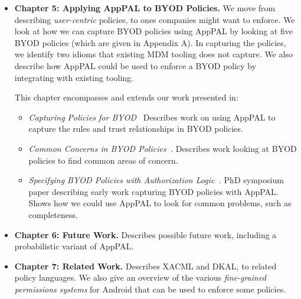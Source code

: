 \documentclass[thesis.tex]{subfiles}
\begin{document}
\begin{itemize}
\item \textbf{Chapter 5: Applying AppPAL to BYOD Policies.}
  We move from describing \emph{user-centric} policies, to ones companies might
  want to enforce. We look at how we can capture BYOD policies using AppPAL by
  looking at five BYOD policies (which are given in Appendix A). In capturing the
  policies, we identify two idioms that existing MDM tooling does not capture. We
  also describe how AppPAL could be used to enforce a BYOD policy by integrating
  with existing tooling.
  
  This chapter encompasses and extends our work presented in:
  \begin{itemize}
  \item\emph{Capturing Policies for BYOD~\cite{hallett_capturing_2017}} Describes work on using AppPAL to capture the rules and trust relationships in BYOD policies.
  \item\emph{Common Concerns in BYOD Policies~\cite{hallett_common_2017}.} Describes work looking at BYOD policies to find common areas of concern.  
  \item\emph{Specifying BYOD Policies with Authorization Logic~\cite{hallett_specifying_2016}.} PhD symposium paper describing early work capturing BYOD policies with AppPAL.  Shows how we could use AppPAL to look for common problems, such as completeness.
  \end{itemize}

\item \textbf{Chapter 6: Future Work.}
  Describes possible future work, including a probabilistic variant of AppPAL.
 
\item \textbf{Chapter 7: Related Work.} 
  Describes XACML and DKAL, to related policy languages. We also give an overview
  of the various \emph{fine-grained permissions systems} for Android that can be
  used to enforce some policies.
\end{itemize}
\end{document}
